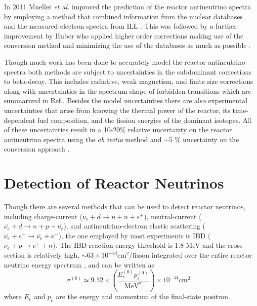 In 2011 Mueller \textit{et al.} improved the prediction of the reactor antineutrino spectra by employing a method that combined information from the nuclear databases and the measured electron spectra from ILL \cite{Mueller}. 
This was followed by a further improvement by Huber who applied higher order corrections making use of the conversion method and minimizing the use of the databases as much as possible \cite{Huber}.

Though much work has been done to accurately model the reactor antineutrino spectra both methods are subject to uncertainties in the subdominant corrections to beta-decay. This includes radiative, weak magnetism, and finite size corrections along with uncertainties in the spectrum shape of forbidden transitions which are summarized in Ref.\cite{HayesVogel}. 
Besides the model uncertainties there are also experimental uncertainties that arise from knowing the thermal power of the reactor, its time-dependent fuel composition, and the fission energies of the dominant isotopes.
All of these uncertainties result in a 10-20\% relative uncertainty on the reactor antineutrino spectra using the \textit{ab initio} method and $\sim$5 \% uncertainty on the conversion approach \cite{Qian:2018wid}.



\section{Detection of Reactor Neutrinos}

Though there are several methods that can be used to detect reactor neutrinos, including charge-current ($\bar{\nu_e} + d \rightarrow n + n + e^+$), neutral-current ($\bar{\nu_e} + d \rightarrow n + p + \bar{\nu_e}$), and antineutrino-electron elastic scattering ($\bar{\nu_e} + e^- \rightarrow \bar{\nu_e} + e^-$), the one employed by most experiments is IBD ($\bar{\nu_e} + p \rightarrow e^+ + n$).
The IBD reaction energy threshold is 1.8 MeV and the cross section is relatively high, $\sim 63 \times 10^{-44} \textrm{cm}^2/\textrm{fisson}$ integrated over the entire reactor neutrino energy spectrum \cite{Qian:2018wid}, and can be written as
\begin{equation}
	\sigma^{(0)} \simeq 9.52 \times \left(\frac{E_e^{(0)}p_e^{(0)}}{\textrm{MeV}^2}\right) \times 10^{-44}\textrm{cm}^2
\end{equation}
where $E_e$ and $p_e$ are the energy and momentum of the final-state positron. 

